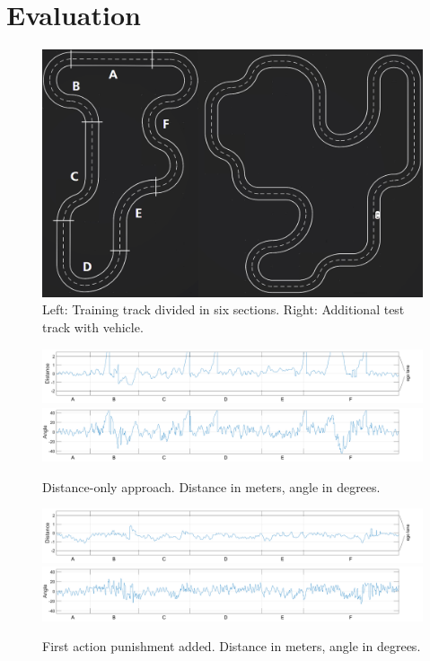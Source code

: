 
\section{Evaluation}\label{sec:evaluation}


\begin{figure}[!t]
\centering
\includegraphics[scale=0.24]{../plots/track_both}
\caption{Left: Training track divided in six sections. Right: Additional test track with vehicle.}
\label{track}
\end{figure}

\begin{figure}[!t]
\centering
\includegraphics[scale=0.265]{../plots/dist_eval_log_distance_serpentine_06speed}
\vspace{0.5em}
\includegraphics[scale=0.265]{../plots/ang_eval_log_distance_serpentine_06speed}
\vspace{-2.25em}
\caption{Distance-only approach. Distance in meters, angle in degrees.}
\label{distance06}
\vspace{1em}
\includegraphics[scale=0.265]{../plots/dist_eval_log_dumb_actions_serpentine_06speed}
\vspace{0.5em}
\includegraphics[scale=0.265]{../plots/ang_eval_log_dumb_actions_serpentine_06speed}
\vspace{-2.25em}
\caption{First action punishment added. Distance in meters, angle in degrees.}
\label{dumbactions06}
\end{figure}

